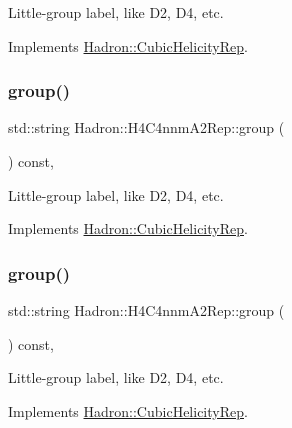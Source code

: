 Little-\/group label, like D2, D4, etc. 

Implements \mbox{\hyperlink{structHadron_1_1CubicHelicityRep_a101a7d76cd8ccdad0f272db44b766113}{Hadron\+::\+Cubic\+Helicity\+Rep}}.

\mbox{\label{structHadron_1_1H4C4nnmA2Rep_ae437f39da33de8e2ad9b152325fa7ce2}} 
\subsubsection{\texorpdfstring{group()}{group()}\hspace{0.1cm}{\footnotesize\ttfamily [2/3]}}
{\footnotesize\ttfamily std\+::string Hadron\+::\+H4\+C4nnm\+A2\+Rep\+::group (\begin{DoxyParamCaption}{ }\end{DoxyParamCaption}) const\hspace{0.3cm}{\ttfamily [inline]}, {\ttfamily [virtual]}}

Little-\/group label, like D2, D4, etc. 

Implements \mbox{\hyperlink{structHadron_1_1CubicHelicityRep_a101a7d76cd8ccdad0f272db44b766113}{Hadron\+::\+Cubic\+Helicity\+Rep}}.

\mbox{\label{structHadron_1_1H4C4nnmA2Rep_ae437f39da33de8e2ad9b152325fa7ce2}} 
\subsubsection{\texorpdfstring{group()}{group()}\hspace{0.1cm}{\footnotesize\ttfamily [3/3]}}
{\footnotesize\ttfamily std\+::string Hadron\+::\+H4\+C4nnm\+A2\+Rep\+::group (\begin{DoxyParamCaption}{ }\end{DoxyParamCaption}) const\hspace{0.3cm}{\ttfamily [inline]}, {\ttfamily [virtual]}}

Little-\/group label, like D2, D4, etc. 

Implements \mbox{\hyperlink{structHadron_1_1CubicHelicityRep_a101a7d76cd8ccdad0f272db44b766113}{Hadron\+::\+Cubic\+Helicity\+Rep}}.

